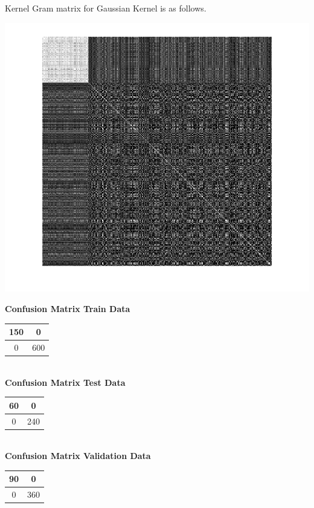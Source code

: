 \documentclass{article}
\begin{document}
Kernel Gram matrix for Gaussian Kernel is as follows.
\begin{center}
\includegraphics[scale=1]{Classification/1b/c_g/kgm}
\end{center}

\begin{flushleft}
\textbf{Confusion Matrix Train Data\\[5pt]}
\begin{tabular}{|c|c|}
\hline
150 & 0 \\
\hline
0 & 600\\
\hline
\end{tabular}
\textbf{\\[10pt] Confusion Matrix Test Data \\[5pt]}
\begin{tabular}{|c|c|}
\hline
60 & 0 \\
\hline
0 & 240\\
\hline
\end{tabular}
\textbf{\\[10pt] Confusion Matrix Validation Data \\[5pt]}
\begin{tabular}{|c|c|}
\hline
90 & 0 \\
\hline
0 & 360\\
\hline
\end{tabular}
\end{flushleft}
\end{document}
